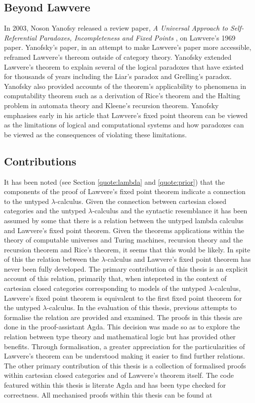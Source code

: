 \subsection{Beyond Lawvere}
\label{section:yanofsky}
In 2003, Noson Yanofsy released a review paper, \textit{A Universal Approach to
Self-Referential Paradoxes, Incompleteness and Fixed Points}
\cite{yanofsky2003universal}, on Lawvere's 1969
paper.  Yanofsky's paper, in an attempt to make Lawvere's paper more accessible,
reframed Lawvere's thereom outside of category theory. Yanofsky extended
Lawvere's theorem to explain several of the logical paradoxes that have existed
for thousands of years including the Liar's paradox and Grelling's paradox.
Yanofsky also provided accounts of the theorem's applicability to phenomena in
computability theorem such as a derivation of Rice's theorem  and the Halting
problem in automata theory and Kleene's recursion theorem. Yanofsky emphasises
early in his article that Lawvere's fixed point theorem can be viewed as the
limitations of logical and computational systems and how paradoxes can be viewed
as the consequences of violating these limitations.
\subsection{Contributions}
It has been noted (see Section \ref{quote:lambda} and \ref{quote:prior}) that the components of the proof of Lawvere's fixed point
theorem indicate a connection to the untyped $\lambda$-calculus. Given the connection between cartesian closed categories and
the untyped $\lambda$-calculus and the syntactic resemblance it has been assumed by
some that there is a relation between the untyped lambda calculus and Lawvere's
fixed point theorem. Given the theorems applications within the theory of
computable universes and Turing machines, recursion theory and the recursion
theorem and Rice's theorem, it seems that this would be likely. In spite of this
the relation between the $\lambda$-calculus and Lawvere's fixed point theorem has
never been fully developed. The primary contribution of this thesis is an
explicit account of this relation, primarily that, when intepreted in the
context of cartesian closed categories corresponding to models of the untyped
$\lambda$-calculus, Lawvere's fixed point theorem is equivalent to the first
fixed point theorem for the untyped $\lambda$-calculus. In the evaluation of
this thesis, previous attempts to formalise the relation are
provided and examined. The proofs in this thesis are done in the proof-assistant Agda. This
decision was made so as to explore the relation between type theory and
mathematical logic but has provided other benefits. Through formalisation, a
greater appreciation for the particularities of Lawvere's theorem can be
understood making it easier to find further relations. The other primary
contribution of this thesis is a collection of formalised proofs within cartesian closed
categories and of Lawvere's theorem itself. The code featured within this thesis
is literate Agda and has been type checked for correctness. All mechanised
proofs within this thesis can be found at 
